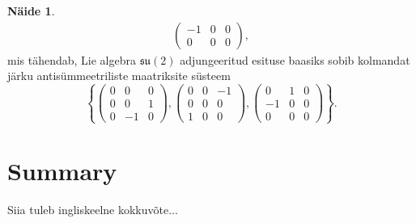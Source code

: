 \documentclass[a4paper,12pt]{article}
\theoremstyle{plain}
\theoremstyle{definition}
\newtheorem{naide}{Näide}[section]
\numberwithin{equation}{section}
\begin{document}
\begin{naide}
\begin{align*}
\begin{pmatrix}
-1 & 0 & 0 \\
0 & 0 & 0
\end{pmatrix},
\end{align*}
mis tähendab, Lie algebra $\mathfrak{su}\left(2\right)$ adjungeeritud esituse baasiks sobib kolmandat järku antisümmeetriliste maatriksite süsteem 
\[\left\lbrace \begin{pmatrix}
0 & 0 & 0 \\
0 & 0 & 1 \\
0 & -1 & 0
\end{pmatrix}, \begin{pmatrix}
0 & 0 & -1 \\
0 & 0 & 0 \\
1 & 0 & 0
\end{pmatrix}, \begin{pmatrix}
0 & 1 & 0 \\
-1 & 0 & 0 \\
0 & 0 & 0
\end{pmatrix} \right\rbrace.\]
\end{naide}


\newpage
\section*{Summary}
Siia tuleb ingliskeelne kokkuvõte...

\newpage
{}


\end{document}
